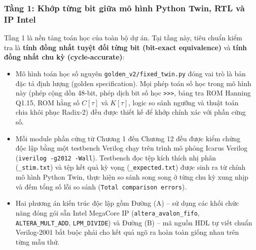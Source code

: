 \subsubsection*{Tầng 1: Khớp từng bit giữa mô hình Python Twin, RTL và IP Intel}
Tầng 1 là nền tảng toán học của toàn bộ dự án. Tại tầng này, tiêu chuẩn kiểm tra là \textbf{tính đồng nhất tuyệt đối từng bit (bit-exact equivalence)} và \textbf{tính đồng nhất chu kỳ (cycle-accurate)}:
\begin{itemize}
    \item Mô hình toán học số nguyên \texttt{golden\_v2/fixed\_twin.py} đóng vai trò là bản đặc tả định lượng (golden specification). Mọi phép toán số học trong mô hình này (phép cộng dồn 48-bit, phép dịch bit số học \texttt{>>>}, bảng tra ROM Hanning Q1.15, ROM hằng số $C[\tau]$ và $K[\tau]$, logic so sánh ngưỡng và thuật toán chia khôi phục Radix-2) đều được thiết kế để khớp chính xác với phần cứng số.
    \item Mỗi module phần cứng từ Chương 1 đến Chương 12 đều được kiểm chứng độc lập bằng một testbench Verilog chạy trên trình mô phỏng Icarus Verilog (\texttt{iverilog -g2012 -Wall}). Testbench đọc tệp kích thích nhị phân (\texttt{\_stim.txt}) và tệp kết quả kỳ vọng (\texttt{\_expected.txt}) được sinh ra từ chính mô hình Python Twin, thực hiện so sánh song song ở từng chu kỳ xung nhịp và đếm tổng số lỗi so sánh (\texttt{Total comparison errors}).
    \item Hai phương án kiến trúc độc lập gồm Đường (A) -- sử dụng các khối chức năng đóng gói sẵn Intel MegaCore IP (\texttt{altera\_}\allowbreak\texttt{avalon\_fifo}, \texttt{ALTERA\_}\allowbreak\texttt{MULT\_ADD}, \texttt{LPM\_DIVIDE}) và Đường (B) -- mã nguồn HDL tự viết chuẩn Verilog-2001 bắt buộc phải cho kết quả ngõ ra hoàn toàn giống nhau trên từng mẫu thử.
\end{itemize}


